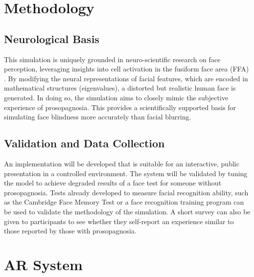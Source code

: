 \documentclass{article}
\begin{document}
    \section{Methodology}

    \subsection{Neurological Basis}
    This simulation is uniquely grounded in neuro-scientific research on face perception, leveraging insights into cell activation in the fusiform face area (FFA) \cite{chang_2017}. By modifying the neural representations of facial features, which are encoded in mathematical structures (eigenvalues), a distorted but realistic human face is generated. In doing so, the simulation aims to closely mimic the subjective experience of prosopagnosia. This provides a scientifically supported basis for simulating face blindness more accurately than facial blurring.

    \subsection{Validation and Data Collection}
    An implementation will be developed that is suitable for an interactive, public presentation in a controlled environment. The system will be validated by tuning the model to achieve degraded results of a face test for someone without prosopagnosia. Tests already developed to measure facial recognition ability, such as the Cambridge Face Memory Test \cite{duchaine_2006} or a face recognition training program \cite{degutis_2014} can be used to validate the methodology of the simulation. A short survey can also be given to participants to see whether they self-report an experience similar to those reported by those with prosopagnosia.

    \section{AR System}
    
\end{document}
